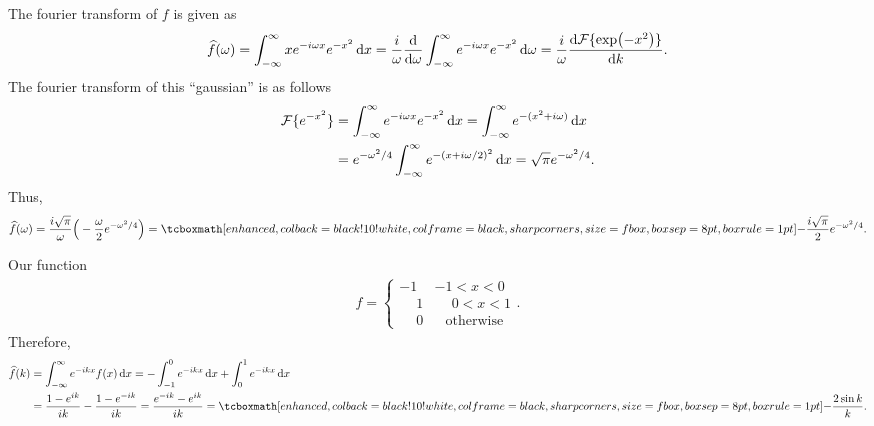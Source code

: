 
The fourier transform of $f$ is given as
\begin{eqnarray}
    \label{eq:fourier-trans-f}
    \widehat{f}(\omega) = \int_{-\infty}^{\infty} xe^{-i\omega x} e^{-x^2} \dd{x} = \frac{i}{\omega} \dv{\omega} \int_{-\infty}^{\infty} e^{-i\omega x} e^{-x^2} \dd{\omega} = \frac{i}{\omega}\dv{\mathcal{F}\{\exp(-x^2)\}}{k}
.\end{eqnarray}
The fourier transform of this ``gaussian'' is as follows
\begin{align}
    \label{eq:fourier-trans-gauss}
    \mathcal{F}\{ e^{-x^2} \} &= \int_{-\infty}^{\infty} e^{-i\omega x} e^{-x^2} \dd{x} = \int_{-\infty}^{\infty} e^{-(x^2 + i\omega)} \dd{x} \notag \\
                              &= e^{-\omega^2/4} \int_{-\infty}^{\infty} e^{-(x + i\omega/2)^2} \dd{x} = \sqrt{\pi} e^{-\omega^2/4}
.\end{align}
Thus,
\begin{eqnarray}
    \label{eq:fourier-deriv}
\widehat{f}(\omega) = \frac{i\sqrt{\pi}}{\omega} \Big( -\frac{\omega}{2} e^{-\omega^2/4} \Big) = \eqbox{ -\frac{i\sqrt{\pi}}{2} e^{-\omega^2/4} }
.\end{eqnarray}



Our function
\begin{eqnarray}
    \label{eq:f-piecewise}
    f = 
    \begin{cases}
        -1 & -1 < x < 0 \\
        \phantom{-}1 &  \phantom{-}0 < x < 1 \\
        \phantom{-}0 &  \phantom{-}\mbox{otherwise}
    \end{cases}
.\end{eqnarray}
Therefore,
\begin{align}
    \label{eq:fourier-f}
    \widehat{f}(k) &= \int_{-\infty}^{\infty} e^{-ikx} f(x) \dd{x} = -\int_{-1}^{0} e^{-ikx} \dd{x} + \int_{0}^{1} e^{-ikx} \dd{x} \notag \\
                   &= \frac{1 - e^{ik}}{ik} - \frac{1 - e^{-ik}}{ik} = \frac{e^{-ik} - e^{ik}}{ik} = \eqbox{-\frac{2\sin{k}}{k}}
.\end{align}

